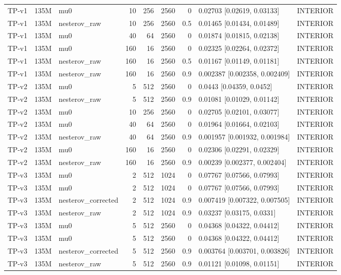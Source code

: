 \begin{longtable}{lllrrrrll}
TP-v1 & 135M & mu0 & 10 & 256 & 2560 & 0 & 0.02703 [0.02619, 0.03133] & INTERIOR \\
TP-v1 & 135M & nesterov\_raw & 10 & 256 & 2560 & 0.5 & 0.01465 [0.01434, 0.01489] & INTERIOR \\
TP-v1 & 135M & mu0 & 40 & 64 & 2560 & 0 & 0.01874 [0.01815, 0.02138] & INTERIOR \\
TP-v1 & 135M & mu0 & 160 & 16 & 2560 & 0 & 0.02325 [0.02264, 0.02372] & INTERIOR \\
TP-v1 & 135M & nesterov\_raw & 160 & 16 & 2560 & 0.5 & 0.01167 [0.01149, 0.01181] & INTERIOR \\
TP-v1 & 135M & nesterov\_raw & 160 & 16 & 2560 & 0.9 & 0.002387 [0.002358, 0.002409] & INTERIOR \\
TP-v2 & 135M & mu0 & 5 & 512 & 2560 & 0 & 0.0443 [0.04359, 0.0452] & INTERIOR \\
TP-v2 & 135M & nesterov\_raw & 5 & 512 & 2560 & 0.9 & 0.01081 [0.01029, 0.01142] & INTERIOR \\
TP-v2 & 135M & mu0 & 10 & 256 & 2560 & 0 & 0.02705 [0.02101, 0.03077] & INTERIOR \\
TP-v2 & 135M & mu0 & 40 & 64 & 2560 & 0 & 0.01964 [0.01664, 0.02103] & INTERIOR \\
TP-v2 & 135M & nesterov\_raw & 40 & 64 & 2560 & 0.9 & 0.001957 [0.001932, 0.001984] & INTERIOR \\
TP-v2 & 135M & mu0 & 160 & 16 & 2560 & 0 & 0.02306 [0.02291, 0.02329] & INTERIOR \\
TP-v2 & 135M & nesterov\_raw & 160 & 16 & 2560 & 0.9 & 0.00239 [0.002377, 0.002404] & INTERIOR \\
TP-v3 & 135M & mu0 & 2 & 512 & 1024 & 0 & 0.07767 [0.07566, 0.07993] & INTERIOR \\
TP-v3 & 135M & mu0 & 2 & 512 & 1024 & 0 & 0.07767 [0.07566, 0.07993] & INTERIOR \\
TP-v3 & 135M & nesterov\_corrected & 2 & 512 & 1024 & 0.9 & 0.007419 [0.007322, 0.007505] & INTERIOR \\
TP-v3 & 135M & nesterov\_raw & 2 & 512 & 1024 & 0.9 & 0.03237 [0.03175, 0.0331] & INTERIOR \\
TP-v3 & 135M & mu0 & 5 & 512 & 2560 & 0 & 0.04368 [0.04322, 0.04412] & INTERIOR \\
TP-v3 & 135M & mu0 & 5 & 512 & 2560 & 0 & 0.04368 [0.04322, 0.04412] & INTERIOR \\
TP-v3 & 135M & nesterov\_corrected & 5 & 512 & 2560 & 0.9 & 0.003764 [0.003701, 0.003826] & INTERIOR \\
TP-v3 & 135M & nesterov\_raw & 5 & 512 & 2560 & 0.9 & 0.01121 [0.01098, 0.01151] & INTERIOR \\

\end{longtable}
